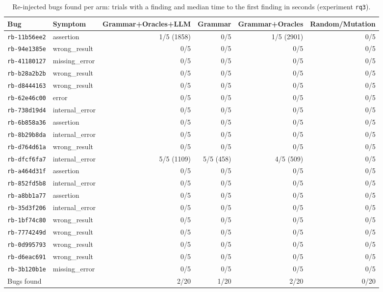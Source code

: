 \begin{table}[t]
  \centering
  \small
  \caption{Re-injected bugs found per arm: trials with a finding and median time to the first finding in seconds (experiment \texttt{rq3}).}
  \label{tab:rq3}
  \begin{tabular}{llrrrr}
    \toprule
    Bug & Symptom & Grammar+Oracles+LLM & Grammar & Grammar+Oracles & Random/Mutation \\
    \midrule
    \texttt{rb-11b56ee2} & assertion & 1/5 (1858) & 0/5 & 1/5 (2901) & 0/5 \\
    \texttt{rb-94e1385e} & wrong\_result & 0/5 & 0/5 & 0/5 & 0/5 \\
    \texttt{rb-41180127} & missing\_error & 0/5 & 0/5 & 0/5 & 0/5 \\
    \texttt{rb-b28a2b2b} & wrong\_result & 0/5 & 0/5 & 0/5 & 0/5 \\
    \texttt{rb-d8444163} & wrong\_result & 0/5 & 0/5 & 0/5 & 0/5 \\
    \texttt{rb-62e46c00} & error & 0/5 & 0/5 & 0/5 & 0/5 \\
    \texttt{rb-738d19d4} & internal\_error & 0/5 & 0/5 & 0/5 & 0/5 \\
    \texttt{rb-6b858a36} & assertion & 0/5 & 0/5 & 0/5 & 0/5 \\
    \texttt{rb-8b29b8da} & internal\_error & 0/5 & 0/5 & 0/5 & 0/5 \\
    \texttt{rb-d764d61a} & wrong\_result & 0/5 & 0/5 & 0/5 & 0/5 \\
    \texttt{rb-dfcf6fa7} & internal\_error & 5/5 (1109) & 5/5 (458) & 4/5 (509) & 0/5 \\
    \texttt{rb-a464d31f} & assertion & 0/5 & 0/5 & 0/5 & 0/5 \\
    \texttt{rb-852fd5b8} & internal\_error & 0/5 & 0/5 & 0/5 & 0/5 \\
    \texttt{rb-a8bb1a77} & assertion & 0/5 & 0/5 & 0/5 & 0/5 \\
    \texttt{rb-35d3f206} & internal\_error & 0/5 & 0/5 & 0/5 & 0/5 \\
    \texttt{rb-1bf74c80} & wrong\_result & 0/5 & 0/5 & 0/5 & 0/5 \\
    \texttt{rb-7774249d} & wrong\_result & 0/5 & 0/5 & 0/5 & 0/5 \\
    \texttt{rb-0d995793} & wrong\_result & 0/5 & 0/5 & 0/5 & 0/5 \\
    \texttt{rb-d6eac691} & wrong\_result & 0/5 & 0/5 & 0/5 & 0/5 \\
    \texttt{rb-3b120b1e} & missing\_error & 0/5 & 0/5 & 0/5 & 0/5 \\
    \midrule
    Bugs found & & 2/20 & 1/20 & 2/20 & 0/20 \\
    \bottomrule
  \end{tabular}
\end{table}
